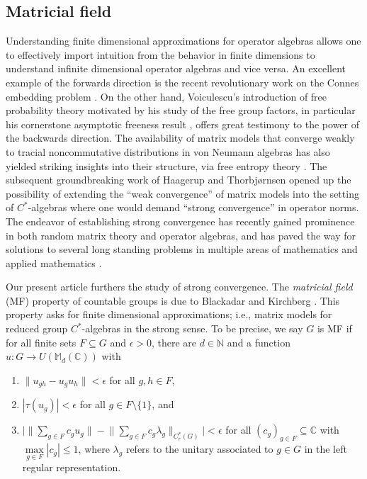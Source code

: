 \documentclass[10pt]{amsart}
\theoremstyle{definition}
\newcommand{\C}{\ensuremath{\mathbb{C}}}
\newcommand{\M}{\ensuremath{\mathbb{M}}}
\newcommand{\N}{\ensuremath{\mathbb{N}}}
\begin{document}
\subsection{Matricial field} 


Understanding finite dimensional approximations for operator algebras allows one to effectively import intuition from the behavior in finite dimensions to understand infinite dimensional operator algebras and vice versa. An excellent example of the forwards direction is the recent revolutionary work on the Connes embedding problem \cite{Ji_2021_MIP_RE}. On the other hand, Voiculescu's introduction of free probability theory motivated by his study of the free group factors, in particular his cornerstone asymptotic freeness result \cite{Voiculescu1991, voiculescu1992free}, offers great testimony to the power of the backwards direction. The availability of matrix models that converge weakly to tracial noncommutative distributions in von Neumann algebras has also yielded striking insights into their structure, via free entropy theory \cite{PicuSurvey, HayesPT}. The subsequent groundbreaking work of Haagerup and Thorbjørnsen \cite{HaagerupThorbjornsen2005} opened up the possibility of extending the ``weak convergence'' of matrix models into the setting of $C^*$-algebras where one would demand ``strong convergence'' in operator norms. The endeavor of establishing strong convergence has recently gained prominence in both random matrix theory and operator algebras, and has paved the way for solutions to several long standing problems in multiple  areas of mathematics and applied mathematics \cite{vanhandel2025strongconvergenceshortsurvey, magee2025strong}.

Our present article furthers the study of strong convergence. The \emph{matricial field} (MF) property of countable groups is due to Blackadar and Kirchberg \cite{BlackadarKirchberg1997}. This property asks for finite dimensional approximations; i.e., matrix models for reduced group $C^*$-algebras in the strong sense. To be precise, we say $G$ is MF if for all finite sets $F \subseteq G$ and $\epsilon > 0$, there are $d \in \N$ and a function $u: G \rightarrow {U}(\M_d(\mathbb{C}))$ with
	\begin{enumerate}
		\item\label{def:MF-group1} $\|u_{gh} - u_gu_h\| < \epsilon$ for all $g, h \in F$,
		\item\label{def:MF-group2} $|\tau(u_g)| < \epsilon$ for all $g \in F \setminus\{1\}$, and
 		\item\label{def:MF-group3} $\big|\big\| \sum\limits_{g \in F} c_g u_g \big\| - \big\| \sum\limits_{g \in F} c_g \lambda_g\big\|_{C^*_r(G)} \big| < \epsilon$ for all $(c_g)_{g \in F} \subseteq \C$ with $\max\limits_{g \in F} |c_g| \leq 1$, where $\lambda_g$ refers to the unitary associated to $g\in G$ in the left regular representation.
	\end{enumerate}
\end{document}
